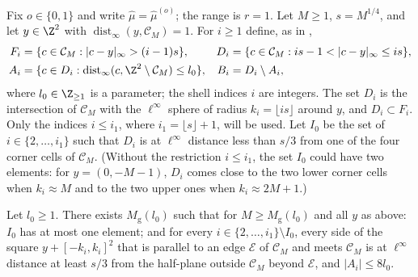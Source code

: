 Fix $o \in \{0, 1\}$ and write $\hat\mu = \hat\mu^{(o)}$; the range is $r = 1$. Let $M \ge 1$, $s = M^{1/4}$, and let $y \in \Z^2$ with $\operatorname{dist}_\infty(y, \mathcal C_M) = 1$. For $i \ge 1$ define, as in \cite[p.~39]{MOS94},
\begin{equation}\label{e:shells}
\begin{aligned}
F_i &= \{ c \in \mathcal C_M : |c - y|_\infty > (i - 1) s \}, & D_i &= \{ c \in \mathcal C_M : i s - 1 < |c - y|_\infty \le i s \}, \\
A_i &= \{ c \in D_i : \operatorname{dist}_\infty(c, \Z^2 \setminus \mathcal C_M) \le l_0 \}, & B_i &= D_i \setminus A_i ,
\end{aligned}
\end{equation}
where $l_0 \in \Z_{\ge1}$ is a parameter; the shell indices $i$ are integers. The set $D_i$ is the intersection of $\mathcal C_M$ with the $\ell^\infty$ sphere of radius $k_i = \lfloor i s \rfloor$ around $y$, and $D_i \subset F_i$. Only the indices $i \le i_1$, where $i_1 = \lfloor s \rfloor + 1$, will be used. Let $I_0$ be the set of $i \in \{2, \dots, i_1\}$ such that $D_i$ is at $\ell^\infty$ distance less than $s/3$ from one of the four corner cells of $\mathcal C_M$. (Without the restriction $i \le i_1$, the set $I_0$ could have two elements: for $y = (0, -M - 1)$, $D_i$ comes close to the two lower corner cells when $k_i \approx M$ and to the two upper ones when $k_i \approx 2M + 1$.)

\begin{lemma}\label{l:shellgeom}
Let $l_0 \ge 1$. There exists $M_{\mathrm g}(l_0)$ such that for $M \ge M_{\mathrm g}(l_0)$ and all $y$ as above: $I_0$ has at most one element; and for every $i \in \{2, \dots, i_1\} \setminus I_0$, every side of the square $y + [-k_i, k_i]^2$ that is parallel to an edge $\mathcal E$ of $\mathcal C_M$ and meets $\mathcal C_M$ is at $\ell^\infty$ distance at least $s/3$ from the half-plane outside $\mathcal C_M$ beyond $\mathcal E$, and $|A_i| \le 8 l_0$.
\end{lemma}

